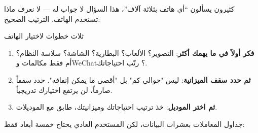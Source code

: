 


كثيرون يسألون “أي هاتف بثلاثة آلاف”، هذا السؤال لا جواب له — لا نعرف ماذا تستخدم الهاتف. الترتيب الصحيح:

\begin{tcbinfo}{ثلاث خطوات لاختيار الهاتف}
\begin{enumerate}
  \item \textbf{فكر أولاً في ما يهمك أكثر}: التصوير؟ الألعاب؟ البطارية؟ الشاشة؟ سلاسة النظام؟ أم فقط مكالمات وWeChat؟ رتّب احتياجاتك.
  \item \textbf{ثم حدد سقف الميزانية}: ليس "حوالي كم" بل "أقصى ما يمكن إنفاقه". حدد سقفاً صارماً، لن يرتفع اختيارك تدريجياً.
  \item \textbf{ثم اختر الموديل}: خذ ترتيب احتياجاتك وميزانيتك، طابق مع الموديلات.
\end{enumerate}

\end{tcbinfo}


جداول المعاملات بعشرات البيانات، لكن المستخدم العادي يحتاج خمسة أبعاد فقط:

